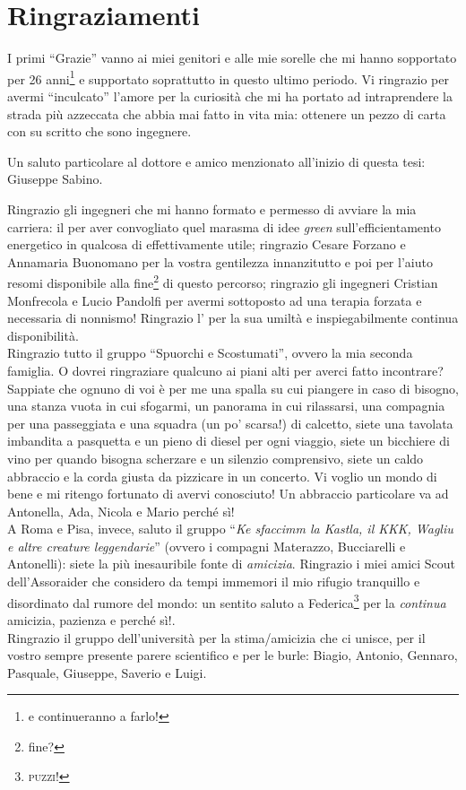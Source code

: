 \chapter*{Ringraziamenti}
\thispagestyle{empty}
I primi ``Grazie'' vanno ai miei genitori e alle mie sorelle che mi hanno sopportato per 26 anni\footnote{e continueranno a farlo!} e supportato soprattutto in questo ultimo periodo. Vi ringrazio per avermi ``inculcato'' l'amore per la curiosità che mi ha portato ad intraprendere la strada più azzeccata che abbia mai fatto in vita mia: ottenere un pezzo di carta con su scritto che sono ingegnere.

Un saluto particolare al dottore e amico menzionato all'inizio di questa tesi: Giuseppe Sabino.

Ringrazio gli ingegneri che mi hanno formato e permesso di avviare la mia carriera: il  per aver convogliato quel marasma di idee \emph{green} sull'efficientamento energetico in qualcosa di effettivamente utile;
ringrazio Cesare Forzano e Annamaria Buonomano per la vostra gentilezza innanzitutto e poi per l'aiuto resomi disponibile alla fine\footnote{fine?} di questo percorso;
ringrazio gli ingegneri Cristian Monfrecola e Lucio Pandolfi per avermi sottoposto ad una terapia forzata e necessaria di nonnismo!
Ringrazio l' per la sua umiltà e inspiegabilmente continua disponibilità.\\
Ringrazio tutto il gruppo ``Spuorchi e Scostumati'', ovvero la mia seconda famiglia. O dovrei ringraziare qualcuno ai piani alti per averci fatto incontrare? Sappiate che ognuno di voi è per me una spalla su cui piangere in caso di bisogno, una stanza vuota in cui sfogarmi, un panorama in cui rilassarsi, una compagnia per una passeggiata e una squadra (un po' scarsa!) di calcetto, siete una tavolata imbandita a pasquetta e un pieno di diesel per ogni viaggio, siete un bicchiere di vino per quando bisogna scherzare e un silenzio comprensivo, siete un caldo abbraccio e la corda giusta da pizzicare in un concerto. Vi voglio un mondo di bene e mi ritengo fortunato di avervi conosciuto! Un abbraccio particolare va ad Antonella, Ada, Nicola e Mario perché sì!\\
A Roma e Pisa, invece, saluto il gruppo ``\emph{Ke sfaccimm la Kastla, il KKK, Wagliu e altre creature leggendarie}'' (ovvero i compagni Materazzo, Bucciarelli e Antonelli): siete la più inesauribile fonte di \emph{amicizia}.
\newpage
\thispagestyle{empty}
Ringrazio i miei amici Scout dell'Assoraider che considero da tempi immemori il mio rifugio tranquillo e disordinato dal rumore del mondo: un sentito saluto a Federica\footnote{\textsc{puzzi!}} per la \emph{continua} amicizia, pazienza e perché sì!.\\Ringrazio il gruppo dell'università per la stima/amicizia che ci unisce, per il vostro sempre presente parere scientifico e per le burle: Biagio, Antonio, Gennaro, Pasquale, Giuseppe, Saverio e Luigi.\\
